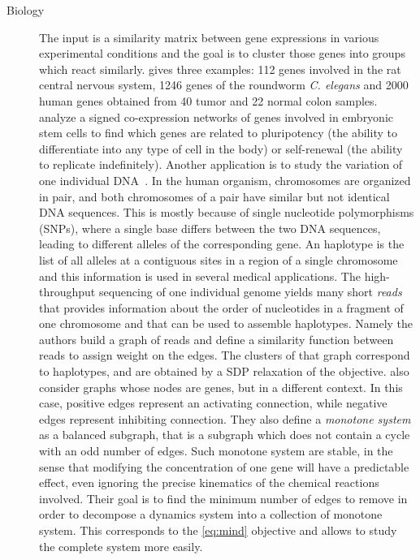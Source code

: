 \begin{description}
   \item[Biology]
      The input is a similarity matrix between gene expressions in various experimental conditions
      and the goal is to cluster those genes into groups which react similarly. \Textcite[Section
      4]{Ben-Dor99} gives three examples: 112 genes involved in the rat central nervous system, 1246
      genes of the roundworm \emph{C. elegans} and 2000 human genes obtained from 40 tumor and 22
      normal colon samples. \Textcite{Mason2009} analyze a signed co-expression networks of genes
      involved in embryonic stem cells to find which genes are related to pluripotency (the ability
      to differentiate into any type of cell in the body) or self-renewal (the ability to replicate
      indefinitely). Another application is to study the variation of one individual
      DNA~\autocite{Das2015}. In the human organism, chromosomes are organized in pair, and both
      chromosomes of a pair have similar but not identical DNA sequences. This is mostly because of
      single nucleotide polymorphisms (SNPs), where a single base differs between the two DNA
      sequences, leading to different alleles of the corresponding gene. An haplotype is the list of
      all alleles at a contiguous sites in a region of a single chromosome and this information is
      used in several medical applications. The high-throughput sequencing of one individual genome
      yields many short \emph{reads} that provides information about the order of nucleotides in a
      fragment of one chromosome and that can be used to assemble haplotypes. Namely the authors
      build a graph of reads and define a similarity function between reads to assign weight on the
      edges. The clusters of that graph correspond to haplotypes, and are obtained by a SDP
      relaxation of the \pcc{} objective. \Textcite{monotoneBiology07} also consider graphs whose
      nodes are genes, but in a different context. In this case, positive edges represent an
      activating connection, while negative edges represent inhibiting connection. They also define
      a \emph{monotone system} as a balanced subgraph, that is a subgraph which does not contain a
      cycle with an odd number of edges. Such monotone system are stable, in the sense that
      modifying the concentration of one gene will have a predictable effect, even ignoring the
      precise kinematics of the chemical reactions involved. Their goal is to find the minimum
      number of edges to remove in order to decompose a dynamics system into a collection of
      monotone system. This corresponds to the \pcc{} \eqref{eq:mind} objective and allows to study
      the complete system more easily.


\end{description}
